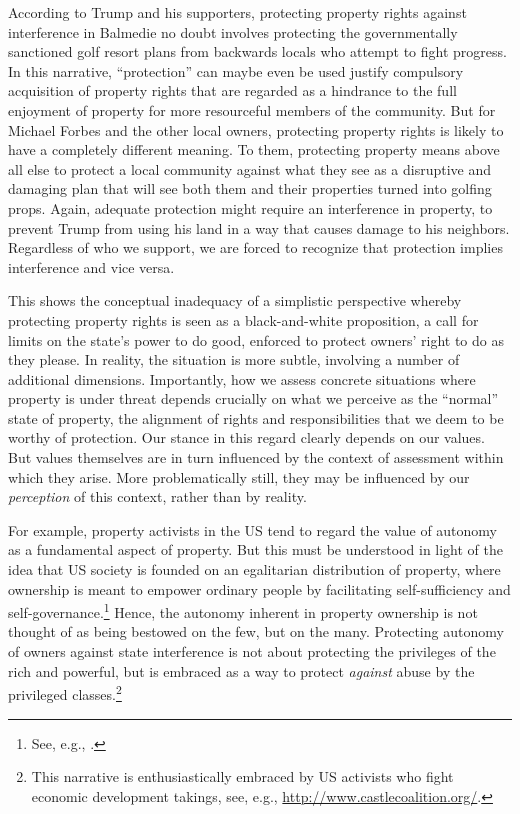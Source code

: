 \documentclass[12pt,a4paper]{book} %
\begin{document}
According to Trump and his supporters, protecting property rights against interference in Balmedie no doubt involves protecting the governmentally sanctioned golf resort plans from backwards locals who attempt to fight progress. In this narrative, ``protection'' can maybe even be used justify compulsory acquisition of property rights that are regarded as a hindrance to the full enjoyment of property for more resourceful members of the community. But for Michael Forbes and the other local owners, protecting property rights is likely to have a completely different meaning. To them, protecting property means above all else to protect a local community against what they see as a disruptive and damaging plan that will see both them and their properties turned into golfing props. Again, adequate protection might require an interference in property, to prevent Trump from using his land in a way that causes damage to his neighbors. Regardless of who we support, we are forced to recognize that protection implies interference and vice versa. 

This shows the conceptual inadequacy of a simplistic perspective whereby protecting property rights is seen as a black-and-white proposition, a call for limits on the state's power to do good, enforced to protect owners' right to do as they please. In reality, the situation is  more subtle, involving a number of additional dimensions. Importantly, how we assess concrete situations where property is under threat depends crucially on what we perceive as the ``normal'' state of property, the alignment of rights and responsibilities that we deem to be worthy of protection. Our stance in this regard clearly depends on our values. But values themselves are in turn influenced by the context of assessment within which they arise. More problematically still, they may be influenced by our \emph{perception} of this context, rather than by reality.

For example, property activists in the US tend to regard the value of autonomy as a fundamental aspect of property. But this must be understood in light of the idea that US society is founded on an egalitarian distribution of property, where ownership is meant to empower ordinary people by facilitating self-sufficiency and self-governance.\footnote{See, e.g., \cite[173]{ely07}.} Hence, the autonomy inherent in property ownership is not thought of as being bestowed on the few, but on the many. Protecting autonomy of owners against state interference is not about protecting the privileges of the rich and powerful, but is embraced as a way to protect {\it against} abuse by the privileged classes.\footnote{This narrative is enthusiastically embraced by US activists who fight economic development takings, see, e.g., \url{http://www.castlecoalition.org/}.} 
\end{document}
